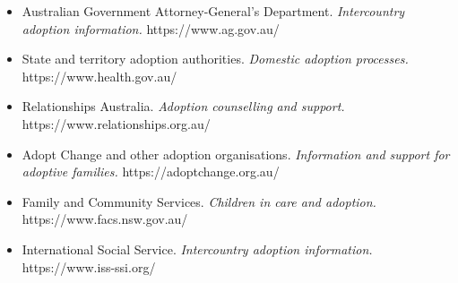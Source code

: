 \begin{itemize}
    \item Australian Government Attorney-General's Department. \textit{Intercountry adoption information.} https://www.ag.gov.au/
    \item State and territory adoption authorities. \textit{Domestic adoption processes.} https://www.health.gov.au/
    \item Relationships Australia. \textit{Adoption counselling and support.} https://www.relationships.org.au/
    \item Adopt Change and other adoption organisations. \textit{Information and support for adoptive families.} https://adoptchange.org.au/
    \item Family and Community Services. \textit{Children in care and adoption.} https://www.facs.nsw.gov.au/
    \item International Social Service. \textit{Intercountry adoption information.} https://www.iss-ssi.org/
\end{itemize}
